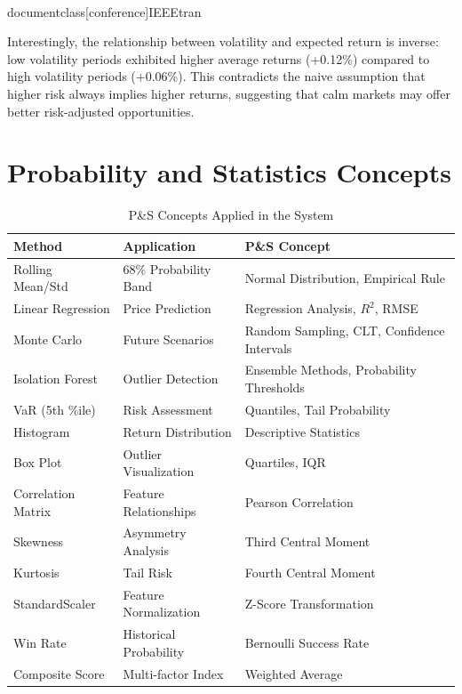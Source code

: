 \\documentclass[conference]{IEEEtran}
\begin{document}
Interestingly, the relationship between volatility and expected return is inverse: low volatility periods exhibited higher average returns (+0.12\%) compared to high volatility periods (+0.06\%). This contradicts the naive assumption that higher risk always implies higher returns, suggesting that calm markets may offer better risk-adjusted opportunities.

\section{Probability and Statistics Concepts}

\begin{table}[H]
\caption{P\&S Concepts Applied in the System}
\begin{center}
\begin{tabular}{|p{2.5cm}|p{2.5cm}|p{2.5cm}|}
\hline
\textbf{Method} & \textbf{Application} & \textbf{P\&S Concept} \\
\hline
Rolling Mean/Std & 68\% Probability Band & Normal Distribution, Empirical Rule \\
\hline
Linear Regression & Price Prediction & Regression Analysis, $R^2$, RMSE \\
\hline
Monte Carlo & Future Scenarios & Random Sampling, CLT, Confidence Intervals \\
\hline
Isolation Forest & Outlier Detection & Ensemble Methods, Probability Thresholds \\
\hline
VaR (5th \%ile) & Risk Assessment & Quantiles, Tail Probability \\
\hline
Histogram & Return Distribution & Descriptive Statistics \\
\hline
Box Plot & Outlier Visualization & Quartiles, IQR \\
\hline
Correlation Matrix & Feature Relationships & Pearson Correlation \\
\hline
Skewness & Asymmetry Analysis & Third Central Moment \\
\hline
Kurtosis & Tail Risk & Fourth Central Moment \\
\hline
StandardScaler & Feature Normalization & Z-Score Transformation \\
\hline
Win Rate & Historical Probability & Bernoulli Success Rate \\
\hline
Composite Score & Multi-factor Index & Weighted Average \\
\hline
\end{tabular}
\label{tab:concepts}
\end{center}
\end{table}
\end{document}
